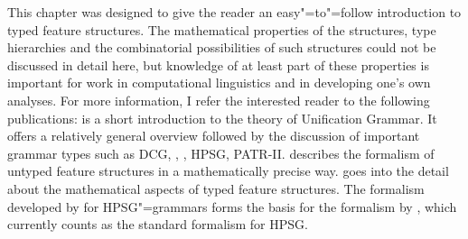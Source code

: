 This chapter was designed to give the reader an easy"=to"=follow introduction to typed feature structures. The mathematical properties of the structures, type hierarchies and the
combinatorial possibilities of such structures could not be discussed in detail here, but knowledge of
at least part of these properties is important for work in computational linguistics and in
developing one's own analyses. For more information, I refer the interested reader to the following publications: 
%
\citet{Shieber86a} is a short introduction to the theory of Unification Grammar. It offers a relatively general overview followed by the discussion of important grammar types
such as DCG, \lfg, \gpsg,
HPSG, PATR-II.
%
\citet{Johnson88} describes the formalism of untyped feature structures in a mathematically precise way.
%
\citet{Carpenter92a} goes into the detail about the mathematical aspects of typed feature structures. The formalism developed by \citet{King99a-u} for HPSG"=grammars forms the basis
for the formalism by \citet{Richter2004a-u}, which currently counts as the standard formalism for HPSG.


